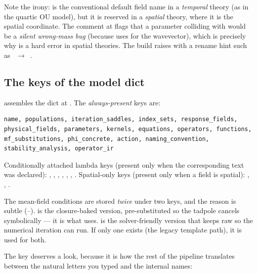 \begin{gotcha}
Note the irony:  is the conventional default field name in a
\emph{temporal} theory (as in the quartic OU model), but it is reserved in a
\emph{spatial} theory, where it is the spatial coordinate. The comment at
 flags that a parameter colliding with 
would be a \emph{silent wrong-mass bug} (because  uses
 for the wavevector), which is precisely why  is a hard
error in spatial theories. The build raises with a rename hint such as
~$\to$~.
\end{gotcha}

\subsection{The keys of the model dict}

 assembles the dict at . The
\emph{always-present} keys are:

\begin{lstlisting}[style=console]
name, populations, iteration_saddles, index_sets, response_fields,
physical_fields, parameters, kernels, equations, operators, functions,
mf_substitutions, phi_concrete, action, naming_convention,
stability_analysis, operator_ir
\end{lstlisting}

Conditionally attached lambda keys (present only when the corresponding text was
declared): , ,
, , ,
, . Spatial-only keys (present only
when a field is spatial): , , .

\begin{gotcha}
The mean-field conditions are stored \emph{twice} under two keys, and the reason
is subtle (--).
 is the closure-baked version, pre-substituted so
the  tadpole cancels symbolically --- it is what
 uses.  is the solver-friendly
version that keeps raw  so the numerical iteration can run. If only
one exists (the legacy template path), it is used for both.
\end{gotcha}

The  key deserves a look, because it is how the rest of
the pipeline translates between the natural letters you typed and the internal
names:

